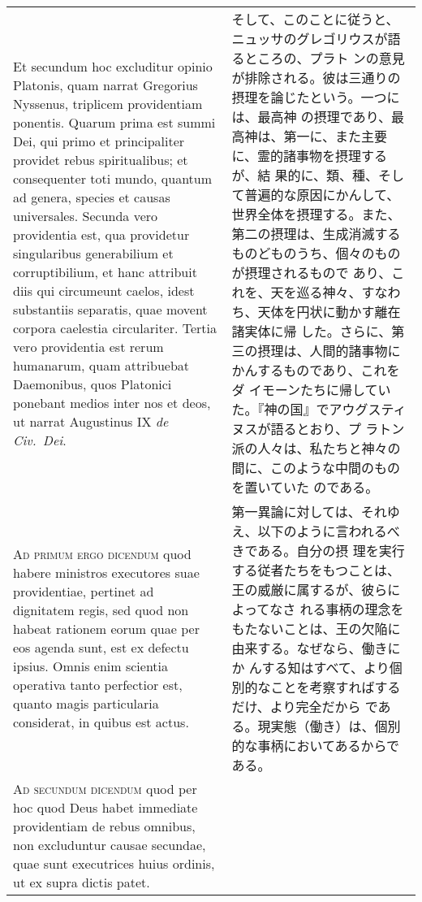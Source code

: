 \documentclass[10pt]{jsarticle} %
\begin{document}
\begin{longtable}{p{21em}p{21em}}
\\

Et secundum hoc
excluditur opinio Platonis, quam narrat Gregorius Nyssenus, triplicem
providentiam ponentis. Quarum prima est summi Dei, qui primo et
principaliter providet rebus spiritualibus; et consequenter toti mundo,
quantum ad genera, species et causas universales. Secunda vero
providentia est, qua providetur singularibus generabilium et
corruptibilium, et hanc attribuit diis qui circumeunt caelos, idest
substantiis separatis, quae movent corpora caelestia
circulariter. Tertia vero providentia est rerum humanarum, quam
attribuebat Daemonibus, quos Platonici ponebant medios inter nos et
deos, ut narrat Augustinus IX {\itshape de Civ.~Dei}.

&

そして、このことに従うと、ニュッサのグレゴリウスが語るところの、プラト
ンの意見が排除される。彼は三通りの摂理を論じたという。一つには、最高神
の摂理であり、最高神は、第一に、また主要に、霊的諸事物を摂理するが、結
果的に、類、種、そして普遍的な原因にかんして、世界全体を摂理する。また、
第二の摂理は、生成消滅するものどものうち、個々のものが摂理されるもので
あり、これを、天を巡る神々、すなわち、天体を円状に動かす離在諸実体に帰
した。さらに、第三の摂理は、人間的諸事物にかんするものであり、これをダ
イモーンたちに帰していた。『神の国』でアウグスティヌスが語るとおり、プ
ラトン派の人々は、私たちと神々の間に、このような中間のものを置いていた
のである。


\\


{\scshape Ad primum ergo dicendum} quod habere ministros
executores suae providentiae, pertinet ad dignitatem regis, sed quod non
habeat rationem eorum quae per eos agenda sunt, est ex defectu
ipsius. Omnis enim scientia operativa tanto perfectior est, quanto magis
particularia considerat, in quibus est actus.

&

第一異論に対しては、それゆえ、以下のように言われるべきである。自分の摂
理を実行する従者たちをもつことは、王の威厳に属するが、彼らによってなさ
れる事柄の理念をもたないことは、王の欠陥に由来する。なぜなら、働きにか
んする知はすべて、より個別的なことを考察すればするだけ、より完全だから
である。現実態（働き）は、個別的な事柄においてあるからである。


\\


{\scshape Ad secundum dicendum} quod per hoc quod Deus
habet immediate providentiam de rebus omnibus, non excluduntur causae
secundae, quae sunt executrices huius ordinis, ut ex supra dictis patet.


\end{longtable}
\end{document}

